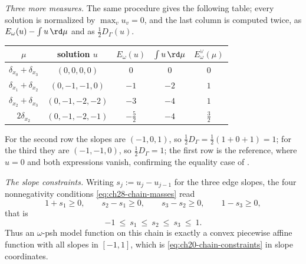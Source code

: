 \begin{example}[{The chain $\Gamma=[0,3]$: a solved equation, verified}]
\emph{Three more measures.}  The same procedure gives the following table;
every solution is normalized by $\max_vu_v=0$, and the last column is
computed twice, as $E_\omega(u)-\int u\,\rd\mu$ and as
$\tfrac12D_\Gamma(u)$.
\begin{center}
\small
\begin{tabular}{c|c|c|c|c}
\toprule
$\mu$&solution $u$&$E_\omega(u)$&$\int u\,\rd\mu$
 &$E^\vee_\omega(\mu)$\\
\midrule
$\delta_{x_0}+\delta_{x_3}$&$(0,0,0,0)$&$0$&$0$&$0$\\
$\delta_{x_1}+\delta_{x_2}$&$(0,-1,-1,0)$&$-1$&$-2$&$1$\\
$\delta_{x_2}+\delta_{x_3}$&$(0,-1,-2,-2)$&$-3$&$-4$&$1$\\
$2\delta_{x_2}$&$(0,-1,-2,-1)$&$-\tfrac52$&$-4$&$\tfrac32$\\
\bottomrule
\end{tabular}
\end{center}
For the second row the slopes are $(-1,0,1)$, so
$\tfrac12D_\Gamma=\tfrac12(1+0+1)=1$; for the third they are
$(-1,-1,0)$, so $\tfrac12D_\Gamma=1$; the first row is the reference,
where $u=0$ and both expressions vanish, confirming the equality case of
.

\emph{The slope constraints.}  Writing $s_j:=u_j-u_{j-1}$ for the three
edge slopes, the four nonnegativity conditions
\eqref{eq:ch28-chain-masses} read
\[
 1+s_1\geq0,\qquad s_2-s_1\geq0,\qquad s_3-s_2\geq0,\qquad 1-s_3\geq0 ,
\]
that is
\begin{equation}
\label{eq:ch28-chain-slope-window}
 -1\ \leq\ s_1\ \leq\ s_2\ \leq\ s_3\ \leq\ 1 .
\end{equation}
Thus an $\omega$-psh model function on this chain is exactly a convex
piecewise affine function with all slopes in $[-1,1]$, which is
\eqref{eq:ch20-chain-constraints} in slope coordinates.


\end{example}
